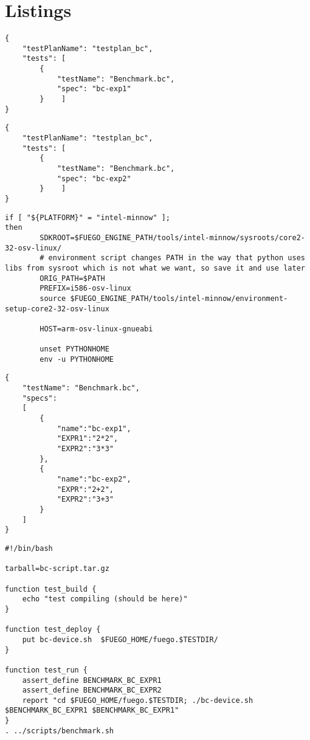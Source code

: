 \section{Listings}
\label{sec:listings}

\begin{lstlisting}[label=testplan-bc-exp1,caption=\texttt{testplan\_bc\_exp1.json} file]
{
    "testPlanName": "testplan_bc",
    "tests": [
        {
            "testName": "Benchmark.bc",
            "spec": "bc-exp1"
        }    ]
}
\end{lstlisting}

\begin{lstlisting}[label=testplan-bc-exp2,caption=\texttt{testplan\_bc\_exp2.json} file]
{
    "testPlanName": "testplan_bc",
    "tests": [
        {
            "testName": "Benchmark.bc",
            "spec": "bc-exp2"
        }    ]
}
\end{lstlisting}


\begin{lstlisting}[label=intel-minnow-tools,caption=\texttt{intel minnow tools} section]
if [ "${PLATFORM}" = "intel-minnow" ];
then
        SDKROOT=$FUEGO_ENGINE_PATH/tools/intel-minnow/sysroots/core2-32-osv-linux/
        # environment script changes PATH in the way that python uses libs from sysroot which is not what we want, so save it and use later
        ORIG_PATH=$PATH
        PREFIX=i586-osv-linux
        source $FUEGO_ENGINE_PATH/tools/intel-minnow/environment-setup-core2-32-osv-linux

        HOST=arm-osv-linux-gnueabi
        
        unset PYTHONHOME
        env -u PYTHONHOME
\end{lstlisting}

\begin{lstlisting}[label=spec-bc,caption=\texttt{Benchmark.bc.spec} file]
  {
    "testName": "Benchmark.bc",
    "specs": 
    [
        {
            "name":"bc-exp1",
            "EXPR1":"2*2",
            "EXPR2":"3*3"
        },
        {
            "name":"bc-exp2",
            "EXPR":"2+2",
            "EXPR2":"3+3"
        }
    ]
}
\end{lstlisting}

\begin{lstlisting}[label=bc-script,caption=\texttt{bc-script.sh} file]
#!/bin/bash

tarball=bc-script.tar.gz

function test_build {
    echo "test compiling (should be here)"
}

function test_deploy {
	put bc-device.sh  $FUEGO_HOME/fuego.$TESTDIR/
}

function test_run {
    assert_define BENCHMARK_BC_EXPR1
    assert_define BENCHMARK_BC_EXPR2
    report "cd $FUEGO_HOME/fuego.$TESTDIR; ./bc-device.sh $BENCHMARK_BC_EXPR1 $BENCHMARK_BC_EXPR1"  
}
. ../scripts/benchmark.sh
\end{lstlisting}


